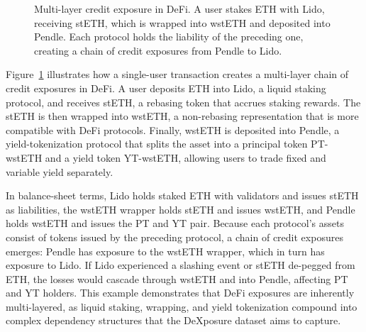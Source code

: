 \begin{figure}[htbp]
    \caption{Multi-layer credit exposure in DeFi. A user stakes ETH with Lido, receiving stETH, which is wrapped into wstETH and deposited into Pendle. Each protocol holds the liability of the preceding one, creating a chain of credit exposures from Pendle to Lido.}
    \label{fig:exposure_example}
\end{figure}

Figure~\ref{fig:exposure_example} illustrates how a single-user transaction creates a multi-layer chain of credit exposures in DeFi.  A user deposits ETH into Lido, a liquid staking protocol, and receives stETH, a rebasing token that accrues staking rewards.  The stETH is then wrapped into wstETH, a non-rebasing representation that is more compatible with DeFi protocols.  Finally, wstETH is deposited into Pendle, a yield-tokenization protocol that splits the asset into a principal token PT-wstETH and a yield token YT-wstETH, allowing users to trade fixed and variable yield separately.

In balance-sheet terms, Lido holds staked ETH with validators and issues stETH as liabilities, the wstETH wrapper holds stETH and issues wstETH, and Pendle holds wstETH and issues the PT and YT pair.  Because each protocol's assets consist of tokens issued by the preceding protocol, a chain of credit exposures emerges: Pendle has exposure to the wstETH wrapper, which in turn has exposure to Lido.  If Lido experienced a slashing event or stETH de-pegged from ETH, the losses would cascade through wstETH and into Pendle, affecting PT and YT holders.  This example demonstrates that DeFi exposures are inherently multi-layered, as liquid staking, wrapping, and yield tokenization compound into complex dependency structures that the DeXposure dataset aims to capture.


